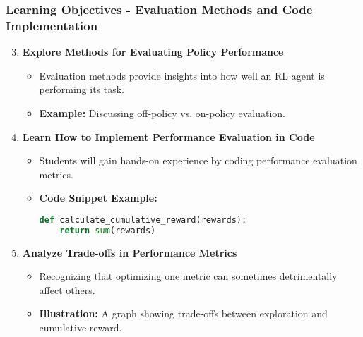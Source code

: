 \documentclass{beamer}
\begin{document}
\begin{frame}[fragile]
    \frametitle{Learning Objectives - Evaluation Methods and Code Implementation}
    \begin{enumerate}
        \setcounter{enumi}{2} %
        \item \textbf{Explore Methods for Evaluating Policy Performance}
        \begin{itemize}
            \item Evaluation methods provide insights into how well an RL agent is performing its task.
            \item \textbf{Example:} Discussing off-policy vs. on-policy evaluation.
        \end{itemize}

        \item \textbf{Learn How to Implement Performance Evaluation in Code}
        \begin{itemize}
            \item Students will gain hands-on experience by coding performance evaluation metrics.
            \item \textbf{Code Snippet Example:}
            \begin{lstlisting}[language=Python]
def calculate_cumulative_reward(rewards):
    return sum(rewards)
            \end{lstlisting}
        \end{itemize}

        \item \textbf{Analyze Trade-offs in Performance Metrics}
        \begin{itemize}
            \item Recognizing that optimizing one metric can sometimes detrimentally affect others.
            \item \textbf{Illustration:} A graph showing trade-offs between exploration and cumulative reward.
        \end{itemize}
    \end{enumerate}
\end{frame}
\end{document}
